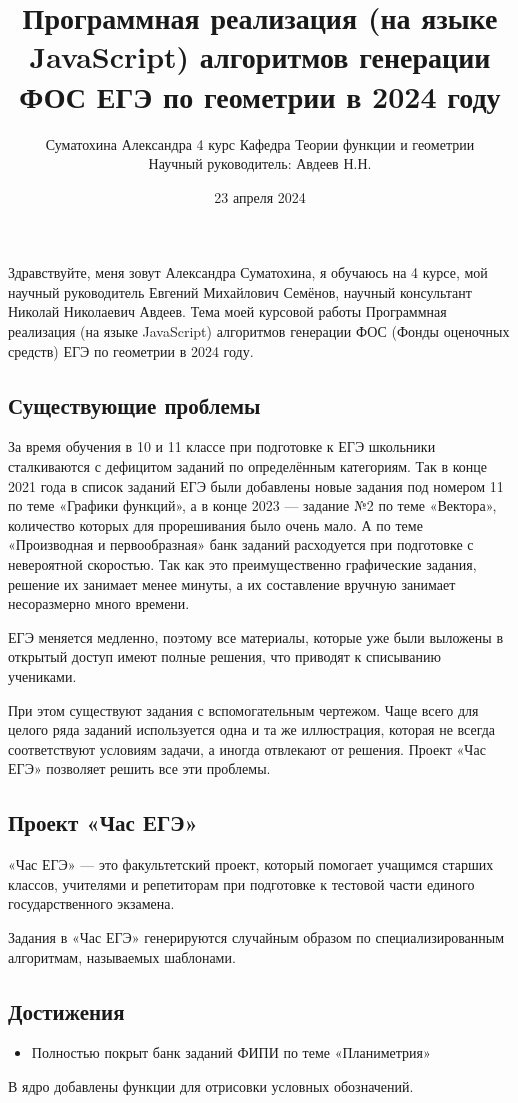 \documentclass[a4paper, 12pt]{extarticle}
\title{Программная реализация (на языке JavaScript) алгоритмов генерации ФОС ЕГЭ по геометрии в 2024 году}
\author{Суматохина Александра 4 курс Кафедра Теории функции и геометрии\\Научный руководитель: Авдеев Н.Н.}
\date{23 апреля 2024}
\begin{document}
\maketitle

Здравствуйте, меня зовут Александра Суматохина, я обучаюсь на 4 курсе, мой научный руководитель Евгений Михайлович Семёнов, научный консультант Николай Николаевич Авдеев. Тема моей курсовой работы Программная реализация (на языке JavaScript) алгоритмов генерации ФОС (Фонды оценочных средств) ЕГЭ по геометрии в 2024 году.

\subsection*{Существующие проблемы}
За время обучения в 10 и 11 классе при подготовке к ЕГЭ школьники сталкиваются с дефицитом заданий по определённым категориям.
Так в конце 2021 года в список заданий ЕГЭ были добавлены новые задания под номером 11 по теме «Графики функций», а в конце 2023 — задание №2 по теме «Вектора», количество которых для прорешивания было очень мало. 
А по теме «Производная и первообразная» банк заданий расходуется при подготовке с невероятной скоростью.
Так как это преимущественно графические задания, решение их занимает менее минуты, а их составление вручную занимает несоразмерно много времени.

ЕГЭ меняется медленно, поэтому все материалы, которые уже были выложены в открытый доступ имеют полные решения, что приводят к списыванию учениками.

При этом существуют задания с вспомогательным чертежом. Чаще всего для целого ряда заданий используется одна и та же иллюстрация, которая не всегда соответствуют условиям задачи, а иногда отвлекают от решения.
Проект «Час ЕГЭ» позволяет решить все эти проблемы.

\subsection*{Проект «Час ЕГЭ»}
«Час ЕГЭ» — это факультетский проект, который помогает учащимся старших классов, учителями и репетиторам при подготовке к тестовой части единого государственного экзамена.

Задания в «Час ЕГЭ» генерируются случайным образом по специализированным алгоритмам, называемых шаблонами.

\subsection*{Достижения}
\begin{itemize}
	\item Полностью покрыт банк заданий ФИПИ по теме «Планиметрия»
\end{itemize}
В ядро добавлены функции для отрисовки условных обозначений.
\end{document}
